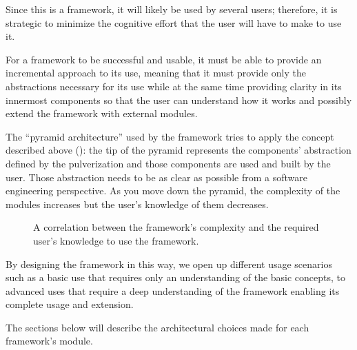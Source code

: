 Since this is a framework, it will likely be used by several users; therefore, it is strategic to minimize the cognitive effort that the user will
have to make to use it.

For a framework to be successful and usable, it must be able to provide an incremental approach to its use,
meaning that it must provide only the abstractions necessary for its use while at the same time providing clarity in its innermost components so that
the user can understand how it works and possibly extend the framework with external modules.

The ``pyramid architecture'' used by the framework tries to apply the concept described above ():
the tip of the pyramid represents the components' abstraction defined by the pulverization and those components are used and built by the user.
Those abstraction needs to be as clear as possible from a software engineering perspective.
As you move down the pyramid, the complexity of the modules increases but the user's knowledge of them decreases.

\begin{figure}
	\centering
	\caption{A correlation between the framework's complexity and the required user's knowledge to use the framework.}
	\label{fig:pyramid-user-knowledge}
\end{figure}

By designing the framework in this way, we open up different usage scenarios such as a basic use that requires only an understanding of the
basic concepts, to advanced uses that require a deep understanding of the framework enabling its complete usage and extension.


The sections below will describe the architectural choices made for each framework's module.


